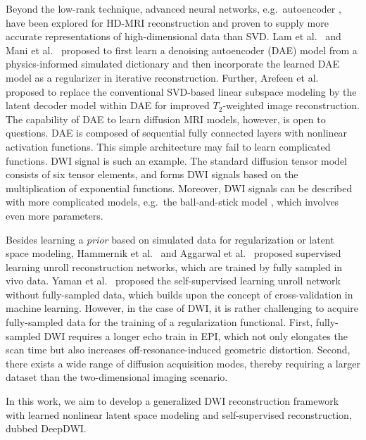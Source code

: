 \documentclass[journal,twoside,web]{ieeecolor}
\begin{document}
	Beyond the low-rank technique,
	advanced neural networks, e.g.~autoencoder \cite{hinton_2006_ae},
	have been explored for HD-MRI reconstruction and
	proven to supply more accurate representations of high-dimensional data than SVD.
	Lam et al.~\cite{lam_2019_mrsi} and Mani et al.~\cite{mani_2021_qmodel} proposed
	to first learn a denoising autoencoder (DAE) model
	from a physics-informed simulated dictionary
	and then incorporate the learned DAE model as a regularizer
	in iterative reconstruction.
	Further, Arefeen et al.~\cite{arefeen_2023_latent} proposed
	to replace the conventional SVD-based linear subspace modeling
	\cite{huang_2012_t2basis}
	by the latent decoder model within DAE
	for improved $T_2$-weighted image reconstruction.
	The capability of DAE to learn diffusion MRI models, however,
	is open to questions.
	DAE is composed of sequential fully connected layers
	with nonlinear activation functions.
	This simple architecture may fail to learn complicated functions.
	DWI signal is such an example.
	The standard diffusion tensor model \cite{basser_1994_dmri}
	consists of six tensor elements,
	and forms DWI signals based on the multiplication of exponential functions.
	Moreover, DWI signals can be described with more complicated models,
	e.g.~the ball-and-stick model \cite{behrens_2003_ballstick},
	which involves even more parameters.

	Besides learning a \textit{prior} based on simulated data
	for regularization or latent space modeling,
	Hammernik et al.~\cite{hammernik_2018_varnet} and
	Aggarwal et al.~\cite{aggarwal_2018_modl}
	proposed supervised learning unroll reconstruction networks,
	which are trained by fully sampled in vivo data.
	Yaman et al.~\cite{yaman_2020_ssdu,yaman_2022_zs}
	proposed the self-supervised learning unroll network
	without fully-sampled data,
	which builds upon the concept of cross-validation in machine learning.
	However, in the case of DWI,
	it is rather challenging to acquire fully-sampled data
	for the training of a regularization functional.
	First, fully-sampled DWI requires a longer echo train in EPI,
	which not only elongates the scan time
	but also increases off-resonance-induced geometric distortion.
	Second, there exists a wide range of diffusion acquisition modes,
	thereby requiring a larger dataset than the two-dimensional imaging scenario.

	In this work, we aim to develop a generalized DWI reconstruction framework
	with learned nonlinear latent space modeling and self-supervised reconstruction,
	dubbed DeepDWI.
\end{document}
